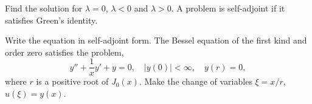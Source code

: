 {%
\begin{Hint}
  \label{hint y''+ly=0 y'-y=0}
  Find the solution for $\lambda = 0$, $\lambda < 0$ and $\lambda > 0$.
  A problem is self-adjoint if it satisfies Green's identity.
\end{Hint}






\begin{Hint}
  \label{hint y''+1xy'+ly=0}
  Write the equation in self-adjoint form.  
  The Bessel equation of the first kind and order zero satisfies the problem,
  \[
  y'' + \frac{1}{x} y' + y = 0, \quad
  |y(0)| < \infty, \quad y(r) = 0,
  \]
  where $r$ is a positive root of $J_0(x)$.  Make the change of variables
  $\xi = x/r$, $u(\xi) = y(x)$.
\end{Hint}







\begin{Hint}
  \label{hint y''+lqy=0}
\end{Hint}






\begin{Hint}
  \label{hint pv''''-qv''+rv=lsv}
\end{Hint}






\raggedbottom
}
